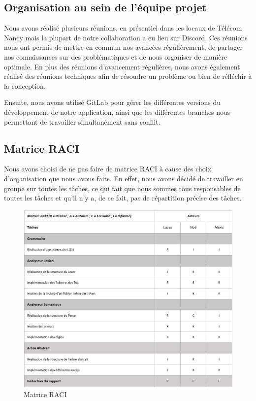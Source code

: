\documentclass[french,a4paper]{article}
\begin{document}
    \subsection{Organisation au sein de l’équipe projet}\label{subsec:organisation-au-sein-de-lequipe-projet}
    Nous avons réalisé plusieurs réunions, en présentiel dans les locaux de Télécom Nancy mais la plupart de notre collaboration a eu lieu sur Discord.
    Ces réunions nous ont permis de mettre en commun nos avancées régulièrement, de partager nos connaissances sur des problématiques et de nous organiser de manière optimale.
    En plus des réunions d'avancement régulières, nous avons également réalisé des réunions techniques afin de résoudre un problème ou bien de réfléchir à la conception.

    Ensuite, nous avons utilisé GitLab pour gérer les différentes versions du développement de notre application, ainsi que les différentes
    branches nous permettant de travailler simultanément sans conflit.

    \subsection{Matrice RACI}\label{subsec:matrice-raci}
    Nous avons choisi de ne pas faire de matrice RACI à cause des choix d'organisation que nous avons faits.
    En effet, nous avons décidé de travailler en groupe sur toutes les tâches, ce qui fait que nous sommes tous responsables de toutes les tâches et qu'il n'y a, de ce fait,
    pas de répartition précise des tâches.

    \begin{figure}[H]
        \centering
        \includegraphics[width=1\textwidth]{RACI}
        \caption{Matrice RACI}\label{fig:figure3}
    \end{figure}
\end{document}
